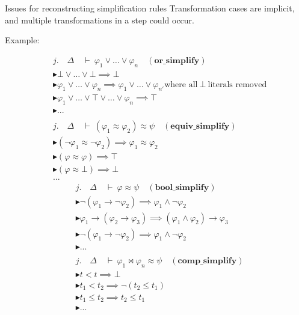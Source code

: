 \documentclass[aspectratio=169,xcolor={dvipsnames}]{beamer}
\begin{document}
\begin{frame}{Issues for reconstructing simplification rules}
Transformation cases are implicit, and multiple transformations in a step could occur.
\begin{block}{Example:}

\begin{multicols}{2}
{\tiny
\begin{align*}
& j.\quad \Delta \quad \vdash~ \varphi_1 \lor \dots \lor \varphi_n \quad (\textbf{or\_simplify}) \\
& \blacktriangleright \bot \lor \dots \lor \bot \implies \bot \\
& \blacktriangleright \varphi_1 \lor \dots \lor \varphi_n \implies \varphi_1 \lor \dots \lor \varphi_{n'} \text{where all} ~\bot~ \text{literals removed}\\
& \blacktriangleright \varphi_1 \lor \dots \lor \top \lor \dots \lor \varphi_n \implies \top \\
& \blacktriangleright ... \\
& \\
& j.\quad \Delta \quad \vdash~ (\varphi_1 \approx \varphi_2) \approx \psi \quad (\textbf{equiv\_simplify}) \\
& \blacktriangleright (\neg \varphi_1 \approx \neg \varphi_2) \implies \varphi_1 \approx \varphi_2 \\
& \blacktriangleright (\varphi \approx \varphi) \implies \top \\
& \blacktriangleright (\varphi \approx \bot) \implies \bot \\
& ...
\end{align*}
\begin{align*}
& j.\quad \Delta \quad \vdash~ \varphi \approx \psi \quad (\textbf{bool\_simplify}) \\
& \blacktriangleright \neg (\varphi_1 \rightarrow \neg \varphi_2) \implies  \varphi_1 \land \neg \varphi_2  \\
& \blacktriangleright \varphi_1 \rightarrow (\varphi_2 \rightarrow \varphi_3) \implies  (\varphi_1 \land \varphi_2) \rightarrow \varphi_3 \\
& \blacktriangleright \neg (\varphi_1 \rightarrow \neg \varphi_2) \implies  \varphi_1 \land \neg \varphi_2  \\
& \blacktriangleright ... \\
& \\
& j.\quad \Delta \quad \vdash~ \varphi_1 \bowtie \varphi_n \approx \psi \quad (\textbf{comp\_simplify}) \\
& \blacktriangleright t < t \implies \bot \\
& \blacktriangleright t_1 < t_2 \implies \neg (t_2 \leq t_1) \\
& \blacktriangleright t_1 \leq t_2 \implies t_2 \leq t_1 \\
& \blacktriangleright ...
\end{align*}
}%
\end{multicols}
\end{block}
\end{frame}
\end{document}
